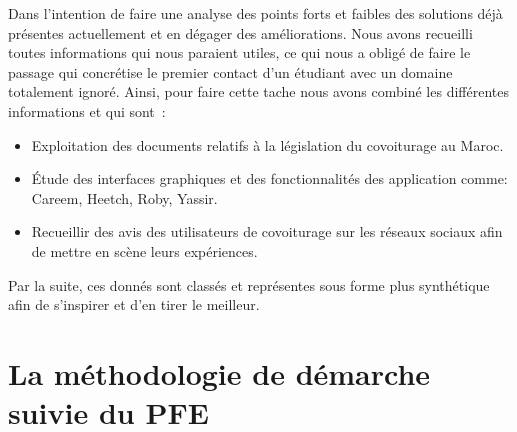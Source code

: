 Dans l'intention de faire une analyse des points forts et faibles des solutions déjà présentes actuellement et en dégager des améliorations. Nous avons recueilli toutes informations qui nous paraient utiles, ce qui nous a obligé de faire le passage qui concrétise le premier contact d'un étudiant avec un domaine totalement ignoré.\newline
Ainsi, pour faire cette tache nous avons combiné les différentes informations et qui sont : 
\begin{itemize}
	\item Exploitation des documents relatifs à la législation du covoiturage au Maroc.
	\item Étude des interfaces graphiques et des fonctionnalités des application comme: Careem, Heetch, Roby, Yassir.
	\item Recueillir des avis des utilisateurs de covoiturage sur les réseaux sociaux afin de mettre en scène leurs expériences.
\end{itemize}
Par la suite, ces donnés sont classés et représentes sous forme plus synthétique afin de s'inspirer et d'en tirer le meilleur.

\section{La méthodologie de démarche suivie du PFE}

